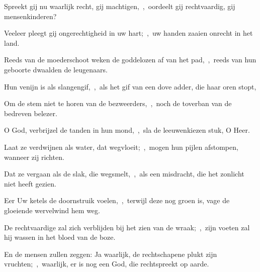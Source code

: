 \documentclass[12pt,twoside,a5paper]{article}
\begin{document}
\begin{halfparskip}
  Spreekt gij nu waarlijk recht, gij machtigen,~\sep\ oordeelt gij rechtvaardig, gij mensenkinderen?


  Veeleer pleegt gij ongerechtigheid in uw hart;~\sep\ uw handen zaaien onrecht in het land.

  Reeds van de moederschoot weken de goddelozen af van het pad,~\sep\ reeds van hun geboorte dwaalden de leugenaars.

  Hun venijn is als slangengif,~\sep\ als het gif van een dove adder, die haar oren stopt,

  Om de stem niet te horen van de bezweerders,~\sep\ noch de toverban van de bedreven belezer.
\end{halfparskip}


\begin{halfparskip}
  O God, verbrijzel de tanden in hun mond,~\sep\ sla de leeuwenkiezen stuk, O Heer.

  Laat ze verdwijnen als water, dat wegvloeit;~\sep\ mogen hun pijlen afstompen, wanneer zij richten.

  Dat ze vergaan als de slak, die wegsmelt,~\sep\ als een misdracht, die het zonlicht niet heeft gezien.

  Eer Uw ketels de doornstruik voelen,~\sep\ terwijl deze nog groen is, vage de gloeiende wervelwind hem weg.

  De rechtvaardige zal zich verblijden bij het zien van de wraak;~\sep\ zijn voeten zal hij wassen in het bloed van de boze.

  En de mensen zullen zeggen: Ja waarlijk, de rechtschapene plukt zijn vruchten;~\sep\ waarlijk, er is nog een God, die rechtspreekt op aarde.
\end{halfparskip}




\PSALMtitle{}{}

\psalmsubtitle{}

\begin{halfparskip}
  \qanona{}
\end{halfparskip}

\psalmsubtitle{}

\begin{halfparskip}
\end{halfparskip}

\psalmsubtitle{}

\begin{halfparskip}
\end{halfparskip}

\end{document}
